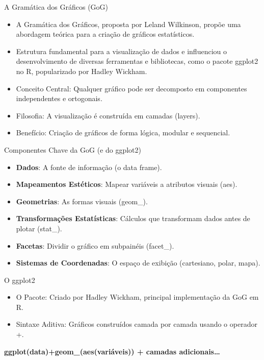 \documentclass[
  ignorenonframetext,
  serif,
  professionalfont,
  usenames,
  dvipsnames,
  aspectratio = 169]{beamer}
\begin{document}
\begin{frame}{A Gramática dos Gráficos (GoG)}
\label{a-gramuxe1tica-dos-gruxe1ficos-gog-1}
\begin{itemize}
\item
  A Gramática dos Gráficos, proposta por Leland Wilkinson, propõe uma
  abordagem teórica para a criação de gráficos estatísticos.
\item
  Estrutura fundamental para a visualização de dados e influenciou o
  desenvolvimento de diversas ferramentas e bibliotecas, como o pacote
  ggplot2 no R, popularizado por Hadley Wickham.
\item
  Conceito Central: Qualquer gráfico pode ser decomposto em componentes
  independentes e ortogonais.
\item
  Filosofia: A visualização é construída em camadas (layers).
\item
  Benefício: Criação de gráficos de forma lógica, modular e sequencial.
\end{itemize}
\end{frame}

\begin{frame}{Componentes Chave da GoG (e do ggplot2)}
\label{componentes-chave-da-gog-e-do-ggplot2}
\begin{itemize}
\item
  \textbf{Dados}: A fonte de informação (o data frame).
\item
  \textbf{Mapeamentos Estéticos}: Mapear variáveis a atributos visuais
  (aes).
\item
  \textbf{Geometrias}: As formas visuais (geom\_).
\item
  \textbf{Transformações Estatísticas}: Cálculos que transformam dados
  antes de plotar (stat\_).
\item
  \textbf{Facetas}: Dividir o gráfico em subpainéis (facet\_).
\item
  \textbf{Sistemas de Coordenadas}: O espaço de exibição (cartesiano,
  polar, mapa).
\end{itemize}
\end{frame}

\begin{frame}{O ggplot2}
\label{o-ggplot2}
\begin{itemize}
\item
  O Pacote: Criado por Hadley Wickham, principal implementação da GoG em
  R.
\item
  Sintaxe Aditiva: Gráficos construídos camada por camada usando o
  operador +.
\end{itemize}

\vspace{1cm}
\center

\textbf{ggplot(data)+geom\_(aes(variáveis)) + camadas
adicionais\ldots{}}
\end{frame}
\end{document}
